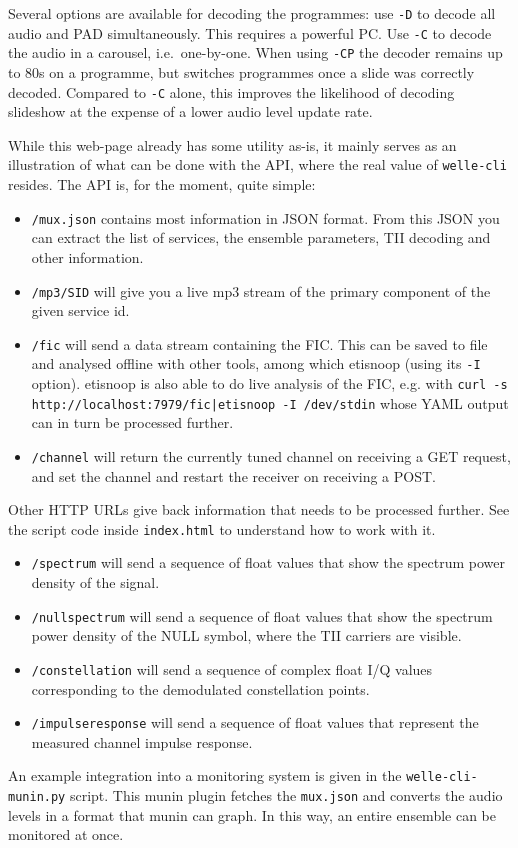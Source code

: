 Several options are available for decoding the programmes: use \texttt{-D} to
decode all audio and PAD simultaneously. This requires a powerful PC. Use
\texttt{-C} to decode the audio in a carousel, i.e.~one-by-one. When using
\texttt{-CP} the decoder remains up to 80s on a programme, but switches
programmes once a slide was correctly decoded. Compared to \texttt{-C} alone,
this improves the likelihood of decoding slideshow at the expense of a lower
audio level update rate.

While this web-page already has some utility as-is, it mainly serves as an
illustration of what can be done with the API, where the real value of
\texttt{welle-cli} resides. The API is, for the moment, quite simple:
\begin{itemize}
    \item \texttt{/mux.json} contains most information in JSON format. From
        this JSON you can extract the list of services, the ensemble parameters,
        TII decoding and other information.
    \item \texttt{/mp3/SID} will give you a live mp3 stream of the primary
        component of the given service id.
    \item \texttt{/fic} will send a data stream containing the FIC. This can be
        saved to file and analysed offline with other tools, among which
        etisnoop (using its \texttt{-I} option). etisnoop is also able to do
        live analysis of the FIC, e.g. with
        \verb+curl -s http://localhost:7979/fic|etisnoop -I /dev/stdin+
        whose YAML output can in turn be processed further.
    \item \texttt{/channel} will return the currently tuned channel on
        receiving a GET request, and set the channel and restart the receiver on
        receiving a POST.
\end{itemize}

Other HTTP URLs give back information that needs to be processed further.
See the script code inside \texttt{index.html} to understand how to work with
it.

\begin{itemize}
    \item \texttt{/spectrum} will send a sequence of float values that
        show the spectrum power density of the signal.
    \item \texttt{/nullspectrum} will send a sequence of float values that
        show the spectrum power density of the NULL symbol, where the TII
        carriers are visible.
    \item \texttt{/constellation} will send a sequence of complex float I/Q
        values corresponding to the demodulated constellation points.
    \item \texttt{/impulseresponse} will send a sequence of float values that
        represent the measured channel impulse response.
\end{itemize}

An example integration into a monitoring system is given in the
\texttt{welle-cli-munin.py} script. This munin plugin fetches the
\texttt{mux.json} and converts the audio levels in a format that munin can
graph. In this way, an entire ensemble can be monitored at once.

